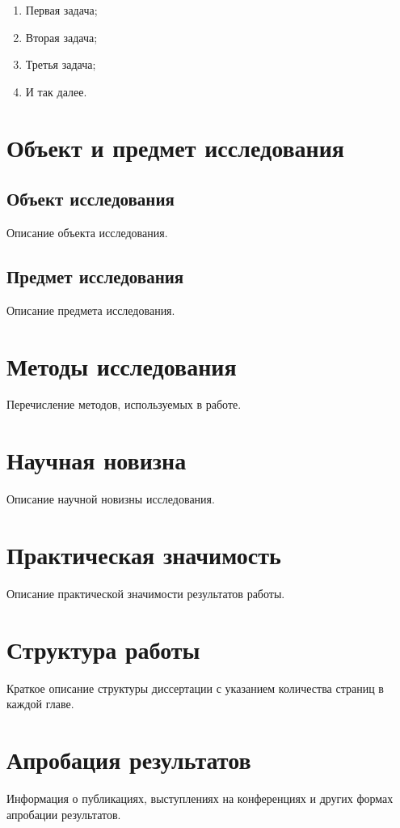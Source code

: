 \begin{enumerate}
    \item Первая задача;
    \item Вторая задача;
    \item Третья задача;
    \item И так далее.
\end{enumerate}

\section{Объект и предмет исследования}

\subsection{Объект исследования}

Описание объекта исследования.

\subsection{Предмет исследования}

Описание предмета исследования.

\section{Методы исследования}

Перечисление методов, используемых в работе.

\section{Научная новизна}

Описание научной новизны исследования.

\section{Практическая значимость}

Описание практической значимости результатов работы.

\section{Структура работы}

Краткое описание структуры диссертации с указанием количества страниц в каждой главе.

\section{Апробация результатов}

Информация о публикациях, выступлениях на конференциях и других формах апробации результатов.
